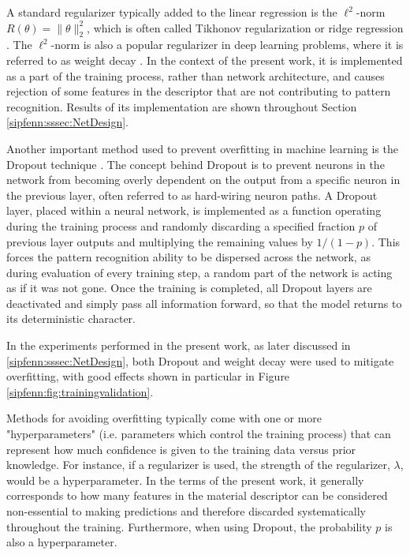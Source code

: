 A standard regularizer typically added to the linear regression is the $\ell^2$-norm $R(\theta) = \|\theta\|_2^2$, which is often called Tikhonov regularization \cite{tikhonov1963solution} or ridge regression \cite{hoerl1970ridge}. The $\ell^2$-norm is also a popular regularizer in deep learning problems, where it is referred to as weight decay \cite{goodfellow2016deep}. In the context of the present work, it is implemented as a part of the training process, rather than network architecture, and causes rejection of some features in the descriptor that are not contributing to pattern recognition. Results of its implementation are shown throughout Section \ref{sipfenn:sssec:NetDesign}.

Another important method used to prevent overfitting in machine learning is the Dropout technique \cite{srivastava2014dropout}. The concept behind Dropout is to prevent neurons in the network from becoming overly dependent on the output from a specific neuron in the previous layer, often referred to as hard-wiring neuron paths. A Dropout layer, placed within a neural network, is implemented as a function operating during the training process and randomly discarding a specified fraction $p$ of previous layer outputs and multiplying the remaining values by $1/(1-p)$. This forces the pattern recognition ability to be dispersed across the network, as during evaluation of every training step, a random part of the network is acting as if it was not gone. Once the training is completed, all Dropout layers are deactivated and simply pass all information forward, so that the model returns to its deterministic character.

In the experiments performed in the present work, as later discussed in \ref{sipfenn:sssec:NetDesign}, both Dropout and weight decay were used to mitigate overfitting, with good effects shown in particular in Figure \ref{sipfenn:fig:trainingvalidation}.

Methods for avoiding overfitting typically come with one or more "hyperparameters" (i.e. parameters which control the training process) that can represent how much confidence is given to the training data versus prior knowledge. For instance, if a regularizer is used, the strength of the regularizer, $\lambda$, would be a hyperparameter. In the terms of the present work, it generally corresponds to how many features in the material descriptor can be considered non-essential to making predictions and therefore discarded systematically throughout the training. Furthermore, when using Dropout, the probability $p$ is also a hyperparameter. 


